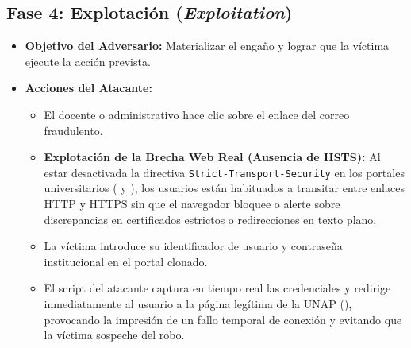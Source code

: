 \subsection*{Fase 4: Explotación (\textit{Exploitation})}
\begin{itemize}
    \item \textbf{Objetivo del Adversario:} Materializar el engaño y lograr que la víctima ejecute la acción prevista.
    \item \textbf{Acciones del Atacante:}
    \begin{itemize}
        \item El docente o administrativo hace clic sobre el enlace del correo fraudulento.
        \item \textbf{Explotación de la Brecha Web Real (Ausencia de HSTS):} Al estar desactivada la directiva \texttt{Strict-\allowbreak Transport-\allowbreak Security} en los portales universitarios ( y ), los usuarios están habituados a transitar entre enlaces HTTP y HTTPS sin que el navegador bloquee o alerte sobre discrepancias en certificados estrictos o redirecciones en texto plano.
        \item La víctima introduce su identificador de usuario y contraseña institucional en el portal clonado.
        \item El script del atacante captura en tiempo real las credenciales y redirige inmediatamente al usuario a la página legítima de la UNAP (), provocando la impresión de un fallo temporal de conexión y evitando que la víctima sospeche del robo.
    \end{itemize}
\end{itemize}

